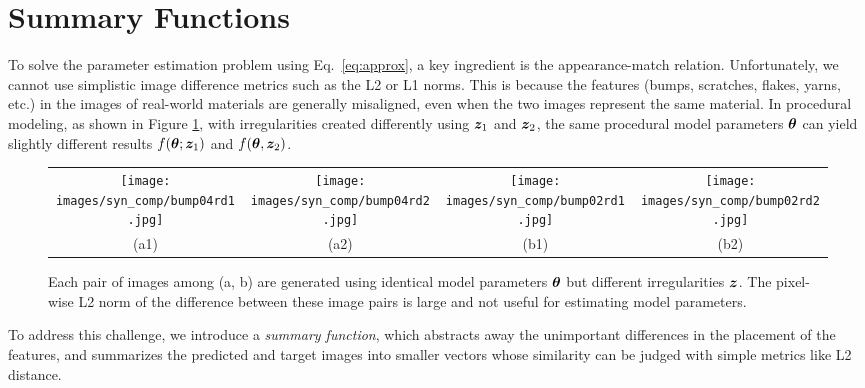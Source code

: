 \section{Summary Functions}
\label{sec:summary_func}
%
%
%
To solve the parameter estimation problem using Eq.~\eqref{eq:approx}, a key ingredient is the appearance-match relation.
Unfortunately, we cannot use simplistic image difference metrics such as the L2 or L1 norms.
This is because the features (bumps, scratches, flakes, yarns, etc.) in the images of real-world materials are generally misaligned, even when the two images represent the same material.
In procedural modeling, as shown in Figure \ref{fig:syn1}, with irregularities created differently using $\bm{z}_1$ and $\bm{z}_2$, the same procedural model parameters $\bm{\theta}$ can yield slightly different results $f(\bm{\theta}; \bm{z}_1)$ and $f(\bm{\theta}, \bm{z}_2)$.

\begin{figure}[t]
	\addtolength{\tabcolsep}{-5pt}
	\begin{tabular}{cccc}
		\texttt{[image: images/syn\_comp/bump04rd1.jpg]} &
		\texttt{[image: images/syn\_comp/bump04rd2.jpg]} &
		\texttt{[image: images/syn\_comp/bump02rd1.jpg]} &
		\texttt{[image: images/syn\_comp/bump02rd2.jpg]} \\
		(a1) & (a2) & (b1) & (b2)
	\end{tabular}
	\caption{\label{fig:syn1}
		Each pair of images among (a, b) are generated using identical model parameters $\bm{\theta}$ but different irregularities $\bm{z}$. The pixel-wise L2 norm of the difference between these image pairs is large and not useful for estimating model parameters.
	}
\end{figure}


To address this challenge, we introduce a \emph{summary function}, which abstracts away the unimportant differences in the placement of the features, and summarizes the predicted and target images into smaller vectors whose similarity can be judged with simple metrics like L2 distance.

